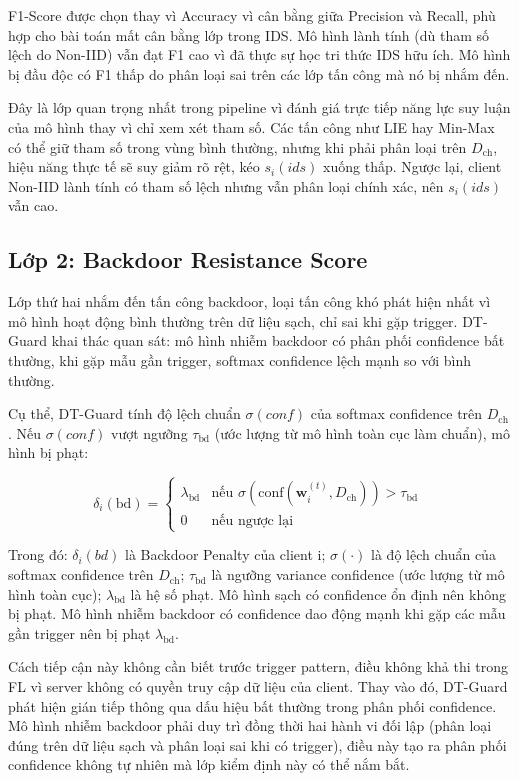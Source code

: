 F1-Score được chọn thay vì Accuracy vì cân bằng giữa Precision và Recall, phù hợp cho bài toán mất cân bằng lớp trong IDS. Mô hình lành tính (dù tham số lệch do Non-IID) vẫn đạt F1 cao vì đã thực sự học tri thức IDS hữu ích. Mô hình bị đầu độc có F1 thấp do phân loại sai trên các lớp tấn công mà nó bị nhắm đến.

Đây là lớp quan trọng nhất trong pipeline vì đánh giá trực tiếp năng lực suy luận của mô hình thay vì chỉ xem xét tham số. Các tấn công như LIE hay Min-Max có thể giữ tham số trong vùng bình thường, nhưng khi phải phân loại trên $D_{\text{ch}}$, hiệu năng thực tế sẽ suy giảm rõ rệt, kéo $s_{i}(ids)$ xuống thấp. Ngược lại, client Non-IID lành tính có tham số lệch nhưng vẫn phân loại chính xác, nên $s_{i}(ids)$ vẫn cao.

\subsection{Lớp 2: Backdoor Resistance Score}
Lớp thứ hai nhắm đến tấn công backdoor, loại tấn công khó phát hiện nhất vì mô hình hoạt động bình thường trên dữ liệu sạch, chỉ sai khi gặp trigger. DT-Guard khai thác quan sát: mô hình nhiễm backdoor có phân phối confidence bất thường, khi gặp mẫu gần trigger, softmax confidence lệch mạnh so với bình thường.

Cụ thể, DT-Guard tính độ lệch chuẩn $\sigma(conf)$ của softmax confidence trên $D_{\text{ch}}$. Nếu $\sigma(conf)$ vượt ngưỡng $\tau_{\text{bd}}$ (ước lượng từ mô hình toàn cục làm chuẩn), mô hình bị phạt:

\begin{equation}
\delta_{i}(\text{bd}) = \begin{cases}
  \lambda_{\text{bd}} & \text{nếu }\sigma(\text{conf}(\mathbf{w}_{i}^{(t)},D_{\text{ch}})) > \tau_{\text{bd}} \\
  0 & \text{nếu ngược lại}
\end{cases}\
\tag{4.2}
\end{equation}

Trong đó: $\delta_{i}(bd)$ là Backdoor Penalty của client i; $\sigma(\cdot)$ là độ lệch chuẩn của softmax confidence trên $D_{\text{ch}}$; $\tau_{\text{bd}}$ là ngưỡng variance confidence (ước lượng từ mô hình toàn cục); $\lambda_{\text{bd}}$ là hệ số phạt. Mô hình sạch có confidence ổn định nên không bị phạt. Mô hình nhiễm backdoor có confidence dao động mạnh khi gặp các mẫu gần trigger nên bị phạt $\lambda_{\text{bd}}$.

Cách tiếp cận này không cần biết trước trigger pattern, điều không khả thi trong FL vì server không có quyền truy cập dữ liệu của client. Thay vào đó, DT-Guard phát hiện gián tiếp thông qua dấu hiệu bất thường trong phân phối confidence. Mô hình nhiễm backdoor phải duy trì đồng thời hai hành vi đối lập (phân loại đúng trên dữ liệu sạch và phân loại sai khi có trigger), điều này tạo ra phân phối confidence không tự nhiên mà lớp kiểm định này có thể nắm bắt.

